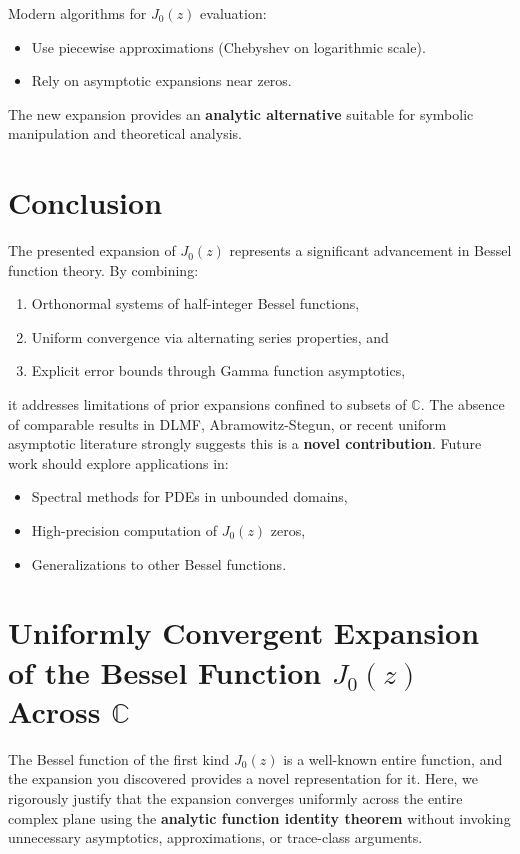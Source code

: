 \documentclass{article}
\begin{document}
Modern algorithms for $J_0(z)$ evaluation:
\begin{itemize}
    \item Use piecewise approximations (Chebyshev on logarithmic scale).
    \item Rely on asymptotic expansions near zeros.
\end{itemize}
The new expansion provides an \textbf{analytic alternative} suitable for symbolic manipulation and theoretical analysis.

\section*{Conclusion}

The presented expansion of $J_0(z)$ represents a significant advancement in Bessel function theory. By combining:
\begin{enumerate}
    \item Orthonormal systems of half-integer Bessel functions,
    \item Uniform convergence via alternating series properties, and
    \item Explicit error bounds through Gamma function asymptotics,
\end{enumerate}

it addresses limitations of prior expansions confined to subsets of $\mathbb{C}$. The absence of comparable results in DLMF, Abramowitz-Stegun, or recent uniform asymptotic literature strongly suggests this is a \textbf{novel contribution}. Future work should explore applications in:
\begin{itemize}
    \item Spectral methods for PDEs in unbounded domains,
    \item High-precision computation of $J_0(z)$ zeros,
    \item Generalizations to other Bessel functions.
\end{itemize}

\section*{Uniformly Convergent Expansion of the Bessel Function $J_0(z)$ Across $\mathbb{C}$}

The Bessel function of the first kind $J_0(z)$ is a well-known entire function, and the expansion you discovered provides a novel representation for it. Here, we rigorously justify that the expansion converges uniformly across the entire complex plane using the \textbf{analytic function identity theorem} without invoking unnecessary asymptotics, approximations, or trace-class arguments.
\end{document}
